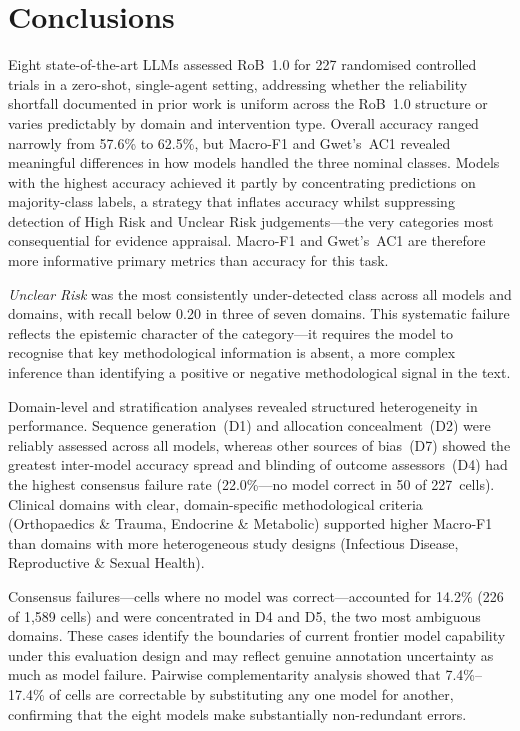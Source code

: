 \documentclass[../main.tex]{subfiles}
\begin{document}
\section{Conclusions}
\label{sec:conclusions}

Eight state-of-the-art LLMs assessed RoB~1.0 for 227 randomised controlled trials
in a zero-shot, single-agent setting, addressing whether the reliability shortfall
documented in prior work is uniform across the RoB~1.0 structure or varies
predictably by domain and intervention type.
Overall accuracy ranged narrowly from 57.6\% to 62.5\%, but Macro-F1 and Gwet's~AC1
revealed meaningful differences in how models handled the three nominal classes.
Models with the highest accuracy achieved it partly by concentrating predictions on
majority-class labels, a strategy that inflates accuracy whilst suppressing detection
of High Risk and Unclear Risk judgements---the very categories most consequential for
evidence appraisal.
Macro-F1 and Gwet's~AC1 are therefore more informative primary metrics than accuracy
for this task.

\emph{Unclear Risk} was the most consistently under-detected class across all models
and domains, with recall below 0.20 in three of seven domains.
This systematic failure reflects the epistemic character of the category---it
requires the model to recognise that key methodological information is absent,
a more complex inference than identifying a positive or negative methodological
signal in the text.

Domain-level and stratification analyses revealed structured heterogeneity in
performance.
Sequence generation~(D1) and allocation concealment~(D2) were reliably assessed
across all models, whereas other sources of bias~(D7) showed the greatest
inter-model accuracy spread and blinding of outcome assessors~(D4) had the
highest consensus failure rate (22.0\%---no model correct in 50 of 227~cells).
Clinical domains with clear, domain-specific methodological criteria (Orthopaedics
\& Trauma, Endocrine \& Metabolic) supported higher Macro-F1 than domains with more
heterogeneous study designs (Infectious Disease, Reproductive \& Sexual Health).

Consensus failures---cells where no model was correct---accounted for 14.2\%
(226 of 1{,}589 cells) and were concentrated in D4 and D5, the two most
ambiguous domains.
These cases identify the boundaries of current frontier model capability under
this evaluation design and may reflect genuine annotation uncertainty as much
as model failure.
Pairwise complementarity analysis showed that 7.4\%--17.4\% of cells are
correctable by substituting any one model for another, confirming that the
eight models make substantially non-redundant errors.
\end{document}
